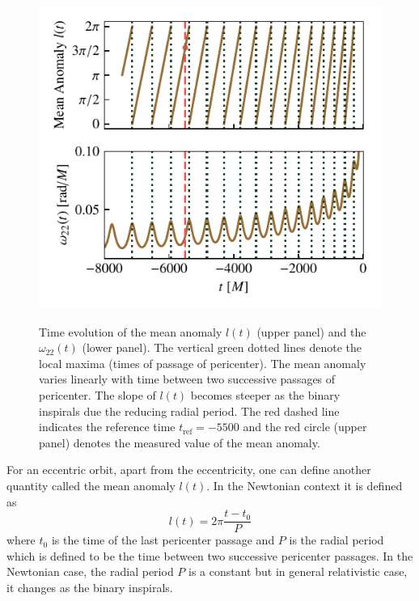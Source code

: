 \documentclass[aps,prd,amsmath,floats,floatfix, twocolumn,
superscriptaddress,nofootinbib,showpacs]{revtex4-1}
\begin{document}
\begin{figure}
\begin{minipage}[t]{0.475\textwidth}
      \includegraphics[width=\columnwidth]{mean_ano_definition}
      \label{fig:mean_anomaly_definition}
      \caption{Time evolution of the mean anomaly $l(t)$ (upper panel) and the $\omega_{22}(t)$ (lower panel). The vertical green dotted lines denote the local maxima (times of passage of pericenter). The mean anomaly varies linearly with time between two successive passages of pericenter. The slope of $l(t)$ becomes steeper as the binary inspirals due the reducing radial period. The red dashed line indicates the reference time $t_{\text{ref}}=-5500$ and the red circle (upper panel) denotes the measured value of the mean anomaly.}
    \end{minipage}
\end{figure}

For an eccentric orbit, apart from the eccentricity, one can define another quantity called the mean anomaly $l(t)$. In the Newtonian context it is defined as
\begin{equation}
\label{eq:mean_anomaly_definition}
l(t) = 2\pi \frac{t - t_0}{P}
\end{equation}
where $t_0$ is the time of the last pericenter passage and $P$ is the radial period which is defined to be the time between two successive pericenter passages.
In the Newtonian case, the radial period $P$ is a constant but in general relativistic case, it changes as the binary inspirals.

\end{document}
